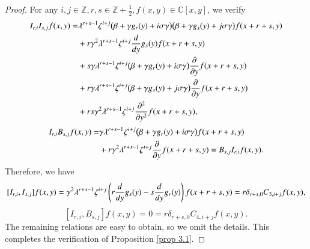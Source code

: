 \documentclass[12pt,reqno]{amsart}
\def\Z{\mathbb{Z}}
\numberwithin{equation}{section}
\begin{document}
\begin{proof}
For any $i,j\in\Z,r,s\in\Z+\frac{1}{2}, f(x,y)\in\mathbb{C}[x,y]$, we verify
\begin{equation*}
\aligned
I_{r,i}I_{s,j}f(x,y)
=&\lambda^{r+s-1}\zeta^{i+j}
\bigl(\beta+\gamma g_r(y)+i\sigma\gamma\bigr)
\bigl(\beta+\gamma g_s(y)+j\sigma\gamma\bigr)f(x+r+s,y)\\
&+r\gamma^2\lambda^{r+s-1}\zeta^{i+j}
\frac{d}{dy}g_s(y)f(x+r+s,y)\\
&+s\gamma\lambda^{r+s-1}\zeta^{i+j}
\bigl(\beta+\gamma g_r(y)+i\sigma\gamma\bigr)
\frac{\partial }{\partial y}f(x+r+s,y)\\
&+r\gamma\lambda^{r+s-1}\zeta^{i+j}
\bigl(\beta+\gamma g_s(y)+j\sigma\gamma\bigr)
\frac{\partial }{\partial y}f(x+r+s,y)\\
&+rs\gamma^2\lambda^{r+s-1}\zeta^{i+j}
\frac{\partial^2}{\partial y^2}f(x+r+s,y),
\endaligned
\end{equation*}
\begin{equation*}
\aligned
I_{r,i}B_{s,j}f(x,y)
=&\gamma\lambda^{r+s-1}\zeta^{i+j}
\bigl(\beta+\gamma g_r(y)+i\sigma\gamma\bigr)f(x+r+s,y)\\
&+r\gamma^2\lambda^{r+s-1}\zeta^{i+j}
\frac{\partial }{\partial y}f(x+r+s,y)
=B_{s,j}I_{r,i}f(x,y).
\endaligned
\end{equation*}
Therefore, we have
\begin{equation*}
\aligned
\relax[I_{r,i},I_{s,j}]f(x,y)
=\gamma^2\lambda^{r+s-1}\zeta^{i+j}
\left(r\frac{d}{dy}g_s(y)-s\frac{d}{dy}g_r(y)\right)
f(x+r+s,y)
=r\delta_{r+s,0}C_{3,i+j}f(x,y),
\endaligned
\end{equation*}
\[
[I_{r,i},B_{s,j}]f(x,y)
=0=r\delta_{r+s,0}C_{4,i+j}f(x,y).
\]
The remaining relations  are easy to obtain,  so we omit
 the details.
This completes the verification of Proposition \ref{prop 3.1}.
\end{proof}
\end{document}
